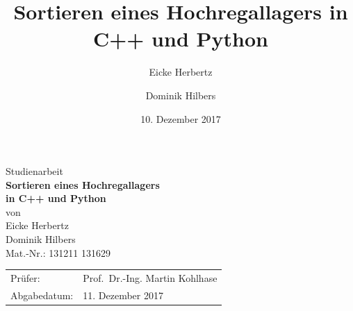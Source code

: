 \documentclass{fh-ium-bama}
\begin{document}

\frontmatter


\title{Sortieren eines Hochregallagers in C++ und Python}
\author{Eicke Herbertz \and Dominik Hilbers}
\date{10. Dezember 2017}


\begin{titlepage}
  \vspace*{20mm}
  \centering
  \large Studienarbeit\\[10mm]
  \textbf{\LARGE Sortieren eines Hochregallagers\\
  in C++ und Python}\\[1ex]
  von\\[1ex]
  Eicke Herbertz\\
  Dominik Hilbers\\[1ex]
  Mat.-Nr.: 131211 131629\\[45mm]
  \begin{tabular}{ll}
    Prüfer:   & Prof.~Dr.-Ing. Martin Kohlhase\\[1ex]
    Abgabedatum: & 11. Dezember 2017
  \end{tabular}
\end{titlepage}
\end{document}
